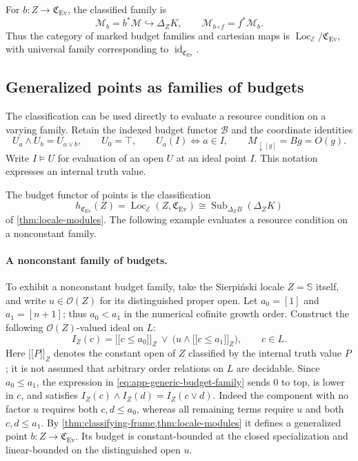 \documentclass[11pt,a4paper]{article}
\numberwithin{algorithm}{section}
\numberwithin{equation}{section}
\theoremstyle{definition}
\theoremstyle{remark}
\theoremstyle{plain}
\newcommand{\E}{\mathcal E}
\newcommand{\OO}{\mathcal O}
\newcommand{\id}{\operatorname{id}}
\newcommand{\incl}{\hookrightarrow}
\newcommand{\llbracket}{\mathopen{[\![}}
\newcommand{\rrbracket}{\mathclose{]\!]}}
\newcommand{\Sub}{\operatorname{Sub}}
\newcommand{\Loc}{\operatorname{Loc}}
\newcommand{\Ev}{{\operatorname{Ev}}}
\newcommand{\Cplx}{\mathfrak C_{\Ev}}
\theoremstyle{definition}
\theoremstyle{plain}
\begin{document}
For $b:Z\to\Cplx$, the classified family is
\begin{equation}\label{eq:cat-classified-budget-pullback}
 \mathscr M_b=b^*\mathscr M\incl\Delta_ZK,
 \qquad \mathscr M_{b\circ f}=f^*\mathscr M_b.
\end{equation}
Thus the category of marked budget families and cartesian maps is
$\Loc_\E/\Cplx$, with universal family corresponding to
$\id_{\Cplx}$.

\subsection{Generalized points as families of budgets}
\label{sec:budget-functor-of-points}
\label{app:complexity-functor-of-points}
\label{app:complexity-generalized-points}

The classification can be used directly to evaluate a resource
condition on a varying family. Retain the indexed budget functor
$\mathcal B$ and the coordinate identities
\[
 U_a\wedge U_b=U_{a\vee b},\qquad U_0=\top,\qquad
 U_a(I)\iff a\in I,\qquad M_{\downarrow[g]}=Bg=O(g).
\]
Write $I\models U$ for evaluation of an open $U$ at an ideal point
$I$. This notation expresses an internal truth value.

The budget functor of points is the classification
\begin{equation}\label{eq:app-budget-functor}
 h_{\Cplx}(Z)=\Loc_\E(Z,\Cplx)
 \cong\Sub_{\Delta_ZB}(\Delta_ZK)
\end{equation}
of \cref{thm:locale-modules}. The following example evaluates a
resource condition on a nonconstant family.

\paragraph{A nonconstant family of budgets.}
To exhibit a nonconstant budget family, take the Sierpi\'nski locale
$Z=\mathbb S$ itself, and write $u\in\OO(Z)$ for its distinguished
proper open.  Let $a_0=[1]$ and $a_1=[n+1]$; thus $a_0<a_1$ in the
numerical cofinite growth order.  Construct the following
$\OO(Z)$-valued ideal on $L$:
\begin{equation}\label{eq:app-generic-budget-family}
 I_Z(c)=
 \llbracket c\le a_0\rrbracket_Z
 \ \vee\
 \bigl(u\wedge\llbracket c\le a_1\rrbracket_Z\bigr),
 \qquad c\in L.
\end{equation}
Here $\llbracket P\rrbracket_Z$ denotes the constant open of $Z$
classified by the internal truth value $P$; it is not assumed that
arbitrary order relations on $L$ are decidable.  Since $a_0\le a_1$,
the expression in \eqref{eq:app-generic-budget-family} sends $0$ to
top, is lower in $c$, and satisfies
$I_Z(c)\wedge I_Z(d)=I_Z(c\vee d)$.  Indeed the component with no
factor $u$ requires both $c,d\le a_0$, whereas all remaining terms
require $u$ and both $c,d\le a_1$.  By
\cref{thm:classifying-frame,thm:locale-modules} it defines a
generalized point $b:Z\to\Cplx$.  Its budget is constant-bounded at
the closed specialization and linear-bounded on the distinguished
open $u$.
\end{document}
